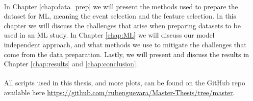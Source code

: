 \documentclass[12pt, a4paper]{book}
\begin{document}
\\In Chapter \ref{chap:data_prep} we will present the methods used to prepare the dataset for ML, meaning the event selection and the feature selection. In this chapter we will discuss the challenges that arise when preparing datasets to be used in an ML study. 
In Chapter \ref{chap:ML} we will discuss our model independent approach, and what methods we use to mitigate the challenges that come from the data preparation. Lastly, we will present and discuss the results in Chapter \ref{chap:results} 
and \ref{chap:conclusion}.\\
\\All scripts used in this thesis, and more plots, can be found on the GitHub repo available here \href{https://github.com/rubenguevara/Master-Thesis/tree/master}{https://github.com/rubenguevara/Master-Thesis/tree/master}.
\end{document}
